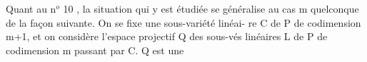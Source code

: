 Quant au n$^o$ 10 ,  la situation qui y est étudiée se généralise au
cas m quelconque de la façon suivante. On se fixe une sous-variété linéai-
re C de P  de codimension m+1, et on considère l'espace projectif Q des
sous-vés linéaires L de P de codimension m passant par C. Q est une

